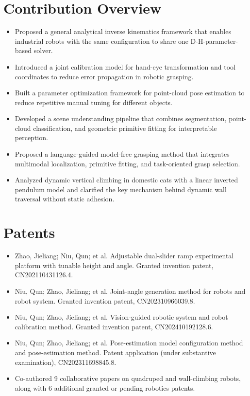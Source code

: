 \documentclass[11pt,a4paper]{article}
\begin{document}
\section*{Contribution Overview}
\begin{itemize}
	\item Proposed a general analytical inverse kinematics framework that enables industrial robots with the same configuration to share one D-H-parameter-based solver.
	\item Introduced a joint calibration model for hand-eye transformation and tool coordinates to reduce error propagation in robotic grasping.
	\item Built a parameter optimization framework for point-cloud pose estimation to reduce repetitive manual tuning for different objects.
	\item Developed a scene understanding pipeline that combines segmentation, point-cloud classification, and geometric primitive fitting for interpretable perception.
	\item Proposed a language-guided model-free grasping method that integrates multimodal localization, primitive fitting, and task-oriented grasp selection.
	\item Analyzed dynamic vertical climbing in domestic cats with a linear inverted pendulum model and clarified the key mechanism behind dynamic wall traversal without static adhesion.
\end{itemize}

\section*{Patents}
\begin{itemize}
	\item Zhao, Jieliang; Niu, Qun; et al. Adjustable dual-slider ramp experimental platform with tunable height and angle. Granted invention patent, CN202110431126.4.
	\item Niu, Qun; Zhao, Jieliang; et al. Joint-angle generation method for robots and robot system. Granted invention patent, CN202310966039.8.
	\item Niu, Qun; Zhao, Jieliang; et al. Vision-guided robotic system and robot calibration method. Granted invention patent, CN202410192128.6.
	\item Niu, Qun; Zhao, Jieliang; et al. Pose-estimation model configuration method and pose-estimation method. Patent application (under substantive examination), CN202311698845.8.
	\item Co-authored 9 collaborative papers on quadruped and wall-climbing robots, along with 6 additional granted or pending robotics patents.
\end{itemize}
\end{document}

